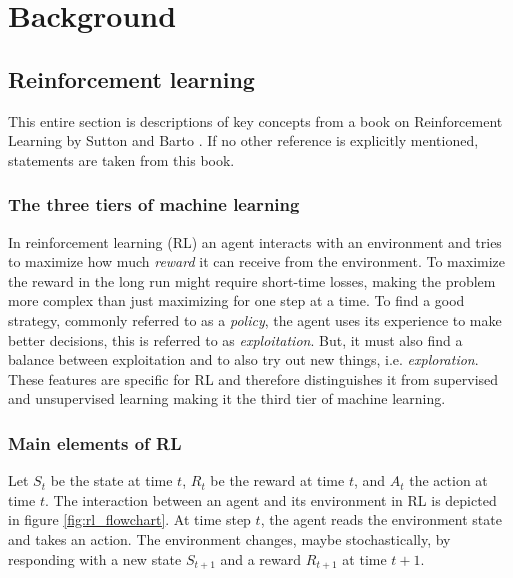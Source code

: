 \section{Background}
\label{sec:background}

\subsection{Reinforcement learning}

This entire section is descriptions of key concepts from a book on
Reinforcement Learning by Sutton and Barto \cite{sutton1998reinforcement}. If
no other reference is explicitly mentioned, statements are taken from this
book.

\subsubsection{The three tiers of machine learning}

In reinforcement learning (RL) an agent interacts with an environment and tries
to maximize how much \textit{reward} it can receive from the environment. To
maximize the reward in the long run might require short-time losses, making the
problem more complex than just maximizing for one step at a time. To find a
good strategy, commonly referred to as a \textit{policy}, the agent uses its
experience to make better decisions, this is referred to as
\textit{exploitation}. But, it must also find a balance between exploitation
and to also try out new things, i.e. \textit{exploration}. These features are
specific for RL and therefore distinguishes it from supervised and unsupervised
learning making it the third tier of machine learning.

\subsubsection{Main elements of RL}

Let $S_t$ be the state at time $t$, $R_t$ be the reward at time $t$, and $A_t$
the action at time $t$. The interaction between an agent and its environment in
RL is depicted in figure \ref{fig:rl_flowchart}. At time step $t$, the agent
reads the environment state and takes an action. The environment changes, maybe
stochastically, by responding with a new state $S_{t+1}$ and a reward $R_{t+1}$
at time $t+1$. 


